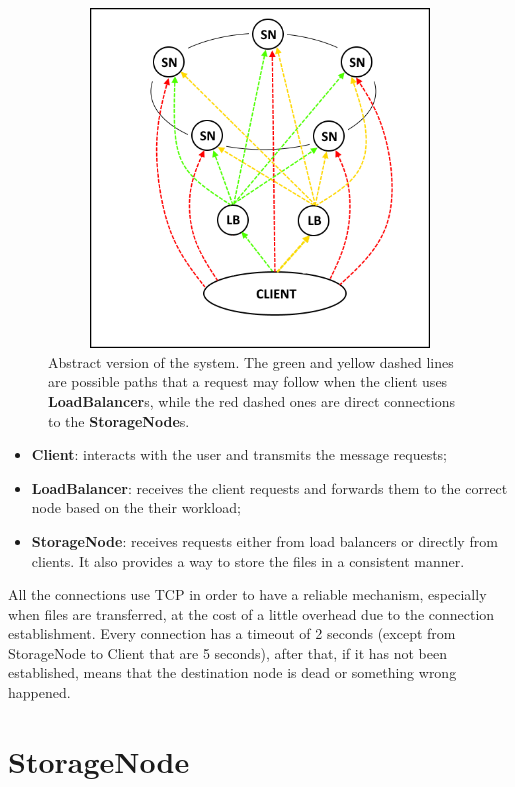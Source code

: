 \documentclass[12pt, a4paper, oneside] {book}
\begin{document}
\begin{figure}[!htpb]
\centering
\includegraphics[width = 120mm, height = 90mm]{img/system.png}
\caption{Abstract version of the system. The green and yellow dashed lines are possible paths that a request may follow when
the client uses \textbf{LoadBalancer}s, while the red dashed ones are direct connections to the \textbf{StorageNode}s.}
\label{fig:abstract_orchestration}
\end{figure}

\begin{itemize}
  \item \textbf{Client}: interacts with the user and transmits the message requests;
  \item \textbf{LoadBalancer}: receives the client requests and forwards them to the correct node based on the their workload;
  \item \textbf{StorageNode}: receives requests either from load balancers or directly from clients. It also provides a way to store the files in a consistent manner.
\end{itemize}

All the connections use TCP in order to have a reliable mechanism, especially when files are transferred,
at the cost of a little overhead due to the connection establishment.
Every connection has a timeout of 2 seconds (except from StorageNode to Client that are 5 seconds), after that, if it has not been established,
means that the destination node is dead or something wrong happened.


\section{StorageNode}
\end{document}

